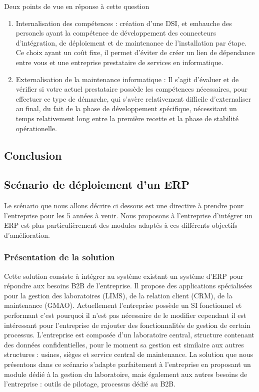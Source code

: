 Deux points de vue en réponse à cette question\\
\begin{enumerate}
\item Internalisation des compétences : création d'une DSI, et embauche des personels ayant la compétence de développement des connecteurs d'intégration, de déploiement et de maintenance de l'installation par étape. Ce choix ayant un coût fixe, il permet d'éviter de créer un lien de dépendance entre vous et une entreprise prestataire de services en informatique.
\item Externalisation de la maintenance informatique : Il s'agit d'évaluer et de vérifier si votre actuel prestataire possède les compétences nécessaires, pour effectuer ce type de démarche, qui s'avère relativement difficile d'externaliser au final, du fait de la phase de développement spécifique, nécessitant un temps relativement long entre la première recette et la phase de stabilité opérationelle.
\end{enumerate}

\subsection{Conclusion}


\subsection{Scénario de déploiement d'un ERP}
Le scénario que nous allons décrire ci dessous est une directive à prendre pour l'entreprise pour les 5 années à venir. Nous proposons à l'entreprise d'intégrer un ERP est plus particulièrement des modules adaptés à ces différents objectifs d'amélioration. 
\subsubsection{Présentation de la solution}
Cette solution consiste à intégrer au système existant un système d'ERP pour répondre aux besoins B2B de l'entreprise. Il propose des applications spécialisées pour la gestion des laboratoires (LIMS), de la relation client (CRM), de la maintenance (GMAO). Actuellement l'entreprise possède un SI fonctionnel et performant c'est pourquoi il n'est pas nécessaire de le modifier cependant il est intéressant pour l'entreprise de rajouter des fonctionnalités de gestion de certain processus. L'entreprise est composée d'un laboratoire central, structure contenant des données confidentielles, pour le moment sa gestion est similaire aux autres structures : usines, sièges et service central de maintenance. La solution que nous présentons dans ce scénario s'adapte parfaitement à l'entreprise en proposant un module dédié à la gestion du laboratoire, mais également aux autres besoins de l'entreprise : outils de pilotage, processus dédié au B2B.   
